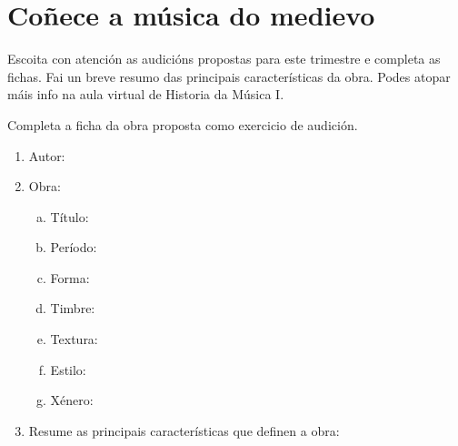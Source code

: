 \section{Coñece a música do medievo}
%
Escoita con atención as audicións propostas para este trimestre e completa as fichas. Fai un breve resumo das principais características da obra.
Podes atopar máis info na aula virtual de Historia da Música I.
%
\begin{multicols}{2}
%
%
\begin{ejercicio} 
%
Completa a ficha da obra proposta como exercicio de audición.
%
	\begin{enumerate}[1.-]
        \vspace*{0.3cm}
		\item
			Autor: \dotfill
			\vspace*{0.3cm}
		\item
			Obra:
			\begin{enumerate}[a)]
			    \item Título: \dotfill \vspace*{0.3cm}
			    \item Período: \dotfill \vspace*{0.3cm}
			    \item Forma: \dotfill \vspace*{0.3cm}
			    \item Timbre: \dotfill 			\vspace*{0.3cm}
			    \item Textura: \dotfill \vspace*{0.3cm}
			    \item Estilo: \dotfill \vspace*{0.3cm}
			    \item Xénero: \dotfill 
			    \vspace*{0.3cm}
			\end{enumerate}
		\item 
		    Resume as principais características que definen a obra:
			\vspace*{8.0cm}			


\end{enumerate}
\end{ejercicio}
\end{multicols}
